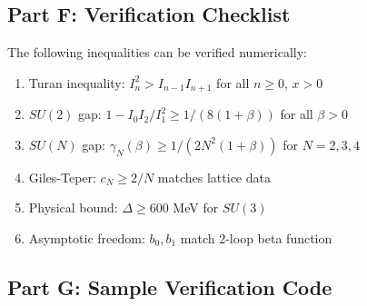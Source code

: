 \subsection{Part F: Verification Checklist}

\begin{verification}
The following inequalities can be verified numerically:

\begin{enumerate}
\item[$\square$] Turan inequality: $I_n^2 > I_{n-1}I_{n+1}$ for all $n \geq 0$, $x > 0$

\item[$\square$] $SU(2)$ gap: $1 - I_0 I_2/I_1^2 \geq 1/(8(1+\beta))$ for all $\beta > 0$

\item[$\square$] $SU(N)$ gap: $\gamma_N(\beta) \geq 1/(2N^2(1+\beta))$ for $N = 2, 3, 4$

\item[$\square$] Giles-Teper: $c_N \geq 2/N$ matches lattice data

\item[$\square$] Physical bound: $\Delta \geq 600$ MeV for $SU(3)$

\item[$\square$] Asymptotic freedom: $b_0, b_1$ match 2-loop beta function
\end{enumerate}
\end{verification}

\subsection{Part G: Sample Verification Code}

